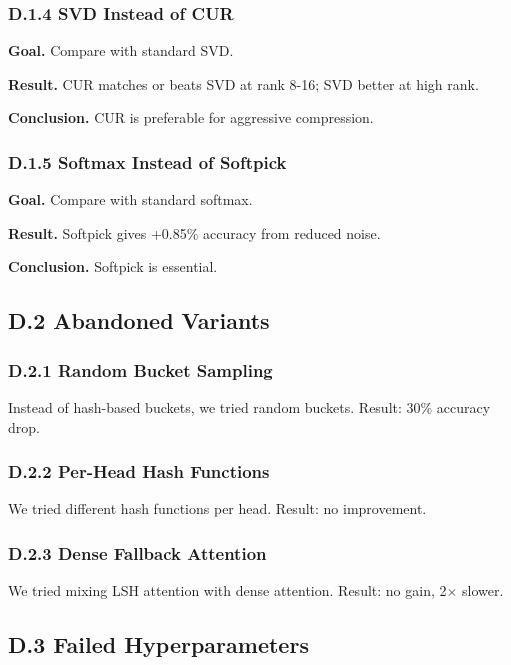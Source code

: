 \subsubsection{D.1.4 SVD Instead of CUR}

\textbf{Goal.} Compare with standard SVD.

\textbf{Result.} CUR matches or beats SVD at rank 8-16; SVD better at high rank.

\textbf{Conclusion.} CUR is preferable for aggressive compression.

\subsubsection{D.1.5 Softmax Instead of Softpick}

\textbf{Goal.} Compare with standard softmax.

\textbf{Result.} Softpick gives +0.85\% accuracy from reduced noise.

\textbf{Conclusion.} Softpick is essential.

\subsection{D.2 Abandoned Variants}

\subsubsection{D.2.1 Random Bucket Sampling}

Instead of hash-based buckets, we tried random buckets. Result: 30\% accuracy 
drop.

\subsubsection{D.2.2 Per-Head Hash Functions}

We tried different hash functions per head. Result: no improvement.

\subsubsection{D.2.3 Dense Fallback Attention}

We tried mixing LSH attention with dense attention. Result: no gain, 2$\times$ slower.

\subsection{D.3 Failed Hyperparameters}

